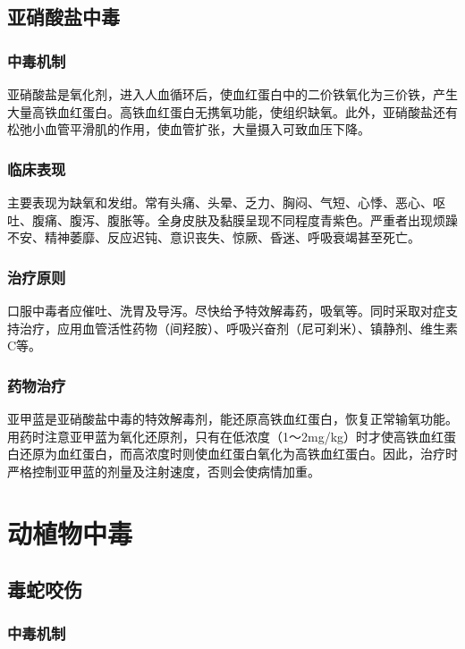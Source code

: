 \subsection{亚硝酸盐中毒}

\subsubsection{中毒机制}

亚硝酸盐是氧化剂，进入人血循环后，使血红蛋白中的二价铁氧化为三价铁，产生大量高铁血红蛋白。高铁血红蛋白无携氧功能，使组织缺氧。此外，亚硝酸盐还有松弛小血管平滑肌的作用，使血管扩张，大量摄入可致血压下降。

\subsubsection{临床表现}

主要表现为缺氧和发绀。常有头痛、头晕、乏力、胸闷、气短、心悸、恶心、呕吐、腹痛、腹泻、腹胀等。全身皮肤及黏膜呈现不同程度青紫色。严重者出现烦躁不安、精神萎靡、反应迟钝、意识丧失、惊厥、昏迷、呼吸衰竭甚至死亡。

\subsubsection{治疗原则}

口服中毒者应催吐、洗胃及导泻。尽快给予特效解毒药，吸氧等。同时采取对症支持治疗，应用血管活性药物（间羟胺）、呼吸兴奋剂（尼可刹米）、镇静剂、维生素C等。

\subsubsection{药物治疗}

亚甲蓝是亚硝酸盐中毒的特效解毒剂，能还原高铁血红蛋白，恢复正常输氧功能。用药时注意亚甲蓝为氧化还原剂，只有在低浓度（1～2mg/kg）时才使高铁血红蛋白还原为血红蛋白，而高浓度时则使血红蛋白氧化为高铁血红蛋白。因此，治疗时严格控制亚甲蓝的剂量及注射速度，否则会使病情加重。

\section{动植物中毒}

\subsection{毒蛇咬伤}

\subsubsection{中毒机制}

